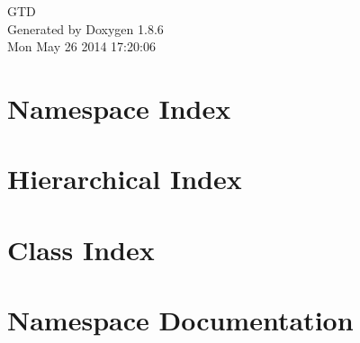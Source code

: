 \documentclass[twoside]{book}
\newcommand{\clearemptydoublepage}{%
  \newpage{\pagestyle{empty}\cleardoublepage}%
}
\begin{document}
\hypersetup{pageanchor=false}
\begin{titlepage}
\vspace*{7cm}
\begin{center}%
{\Large G\-T\-D }\\
\vspace*{1cm}
{\large Generated by Doxygen 1.8.6}\\
\vspace*{0.5cm}
{\small Mon May 26 2014 17:20:06}\\
\end{center}
\end{titlepage}
\clearemptydoublepage
\tableofcontents
\clearemptydoublepage
{}
\hypersetup{pageanchor=true}

\chapter{Namespace Index}

\chapter{Hierarchical Index}

\chapter{Class Index}

\chapter{Namespace Documentation}

\end{document}
